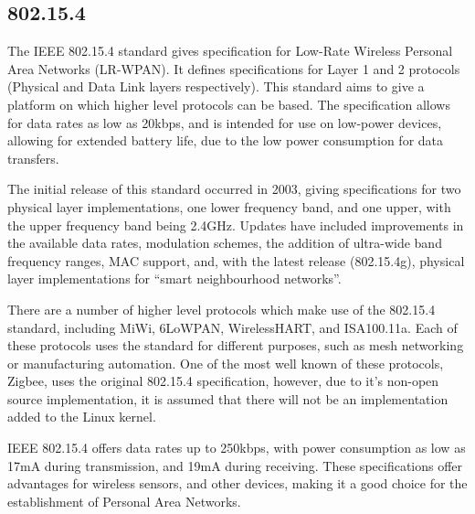 \subsection{802.15.4}

The IEEE 802.15.4 standard gives specification for Low-Rate Wireless Personal Area
Networks (LR-WPAN). It defines specifications for Layer 1 and 2 protocols (Physical
and Data Link layers respectively)\cite{ott_2012}. This standard aims to give a platform
on
which higher level protocols can be based. The specification allows for data
rates as low as 20kbps, and is intended for use on low-power devices, allowing
for extended battery life, due to the low power consumption for data
transfers\cite{electronics_notes}.

The initial release of this standard occurred in 2003, giving specifications for
two physical layer implementations, one lower frequency band, and one upper,
with the upper frequency band being 2.4GHz. Updates have included improvements
in the available data rates, modulation schemes, the addition of ultra-wide band
frequency ranges, MAC support, and, with the latest release (802.15.4g),
physical layer implementations for ``smart neighbourhood
networks''\cite{electronics_notes}.

There are a number of higher level protocols which make use of the 802.15.4
standard, including MiWi, 6LoWPAN, WirelessHART, and ISA100.11a. Each of these
protocols uses the standard for different purposes, such as mesh networking or
manufacturing automation. One of the most well known of these protocols, Zigbee,
uses the original 802.15.4 specification, however, due to it's non-open source
implementation, it is assumed that there will not be an implementation added to
the Linux kernel\cite{ott_2012}.

IEEE 802.15.4 offers data rates up to 250kbps, with power consumption as low as
17mA during transmission, and 19mA during receiving. These specifications
offer advantages for wireless sensors, and other devices, making it a good
choice for the establishment of Personal Area Networks\cite{ott_2012}.

